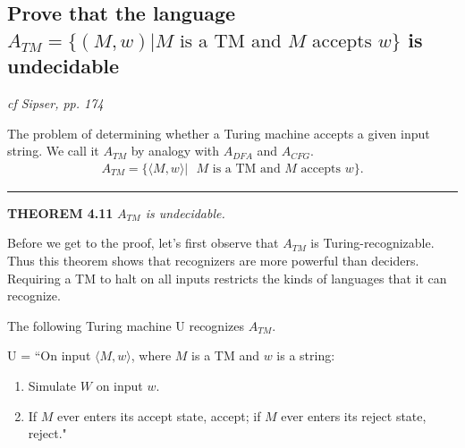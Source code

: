 \documentclass[main.tex]{subfiles}
\begin{document}
\subsection{Prove that the language $A_{TM} = \{(M, w) | M \text{ is a TM and } M \text{ accepts } w\}$ is undecidable} \label{subsection:atm_undec}
\emph{cf Sipser, pp. 174}
\par The problem of determining whether a Turing machine accepts a given input string. We call it $A_{TM}$ by analogy with $A_{DFA}$ and $A_{CFG}$. 
\begin{align*}
     A_{TM} = \{\langle M,w \rangle |\text{ $M$ is a TM and $M$ accepts $w$}\}.
\end{align*}
\par\rule{\textwidth}{0.4pt}
\textbf{THEOREM 4.11} \textit{$A_{TM}$ is undecidable.}
\par Before we get to the proof, let’s first observe that $A_{TM}$ is Turing-recognizable.
Thus this theorem shows that recognizers are more powerful than deciders. Requiring a TM to halt on all inputs restricts the kinds of languages that it can recognize.
\par The following Turing machine U recognizes $A_{TM}$. 
\par U = “On input $\langle M, w\rangle$, where $M$ is a TM and $w$ is a string:
\begin{enumerate}
    \item Simulate $W$ on input $w$.
    \item If $M$ ever enters its accept state, accept; if $M$ ever enters its
reject state, reject."
\end{enumerate}
\end{document}
